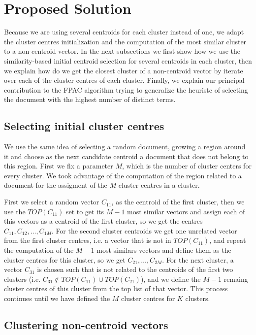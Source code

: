 \documentclass[runningheads]{llncs}
\begin{document}
\section{Proposed Solution}

Because we are using several centroids for each cluster instead of one,
we adapt the cluster centres initialization and the computation
of the most similar cluster to a non-centroid vector.
In the next subsections we first show how we use the similarity-based
initial centroid selection for several centroids in each cluster,
then we explain how do we get the closest cluster of a non-centroid
vector by iterate over each of the cluster centres of each cluster.
Finally, we explain our principal contribution to the FPAC algorithm
trying to generalize the heuristc of selecting the document
with the highest number of distinct terms.


\subsection{Selecting initial cluster centres}

We use the same idea of selecting a random document, growing a region around it and choose as the next candidate centroid a document that does not belong to this region.
First we fix a parameter $M$, which is the number of cluster centers for every 
cluster. We took advantage of the computation of the region related to a document for the assigment of the $M$ cluster centres in a cluster.

First we select a random vector $C_{11}$, as the centroid of the first cluster, then we
use the $TOP(C_{11})$ set to get its $M - 1$ most similar vectors and assign each of
this vectors as a centroid of the first cluster, so we get the centres 
$C_{11}, C_{12},  \dots, C_{1M}$. For the second cluster centroids
we get one unrelated vector from the first cluster centres, i.e. a vector that is not in $TOP(C_{11})$, and 
repeat the computation of the $M-1$ most similars vectors and define them as the cluster centres for this cluster, so we get $C_{21}, \dots, C_{2M}$.
For the next cluster, a vector $C_{31}$ is chosen such that is not
related to the centroids of the 
first two clusters (i.e. $C_{31} \notin TOP(C_{11}) \cup TOP(C_{21})$), and we define the $M-1$ remaing cluster centres of this cluster from the top 
list of that vector. This process continues until we have defined the $M$ cluster centres for $K$ clusters.

\subsection{Clustering non-centroid vectors}
\end{document}
